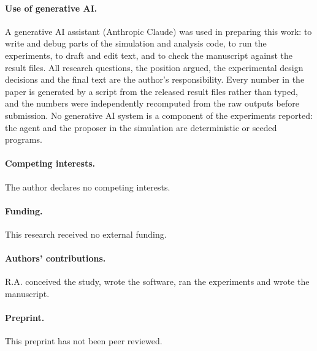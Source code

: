 \documentclass[11pt]{article}
\newif\ifanon
\begin{document}
\paragraph{Use of generative AI.} A generative AI assistant (Anthropic Claude) was used in preparing this work: to write and debug parts of the simulation and analysis code, to run the experiments, to draft and edit text, and to check the manuscript against the result files. All research questions, the position argued, the experimental design decisions and the final text are the author's responsibility. Every number in the paper is generated by a script from the released result files rather than typed, and the numbers were independently recomputed from the raw outputs before submission. No generative AI system is a component of the experiments reported: the agent and the proposer in the simulation are deterministic or seeded programs.

\paragraph{Competing interests.} The author declares no competing interests.

\paragraph{Funding.} This research received no external funding.

\paragraph{Authors' contributions.} \ifanon Withheld for review.\else R.A. conceived the study, wrote the software, ran the experiments and wrote the manuscript.\fi

\paragraph{Preprint.} \ifanon A preprint of this manuscript is posted on arXiv; its identifier will be disclosed to the editor.\else This preprint has not been peer reviewed.\fi
\end{document}
